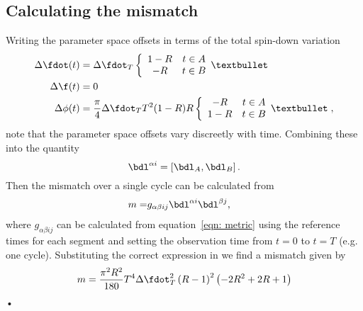 
\subsection{Calculating the mismatch}
Writing the parameter space offsets in terms of the total spin-down variation
\begin{align}
\Delta\fdot(t) &= \dST\two{1-R}{-R} \\
\Delta\f(t) &= 0  \\
\Delta\phi(t) & = \frac{\pi}{4} \dST T^{2}(1-R)R \two{-R}{1-R},
\label{eqn: Lyne parameter space offsets}
\end{align}
note that the parameter space offsets vary discreetly with time. Combining
these into the quantity 
\begin{equation}
\bdl^{\alpha i} = \left[\bdl_{A}, \bdl_{B}\right].
\end{equation}
Then the mismatch over a single cycle can be calculated from
\begin{align}
m = & g_{\alpha\beta ij}\bdl^{\alpha i} \bdl^{\beta j},
\end{align}
where $g_{\alpha\beta i j}$ can be calculated from equation~\eqref{eqn: metric}
using the reference times for each segment and setting the observation time
from $t=0$ to $t=T$ (e.g. one cycle). Substituting the correct expression in we find a mismatch given by
\begin{equation}
m = \frac{\pi^{2} R^{2}}{180} T^{4} \dST^{2} \left(R - 1\right)^{2} 
    \left(-2 R^{2} + 2 R + 1\right)
\label{eqn: mismatch lyne single switch}
\end{equation}•

